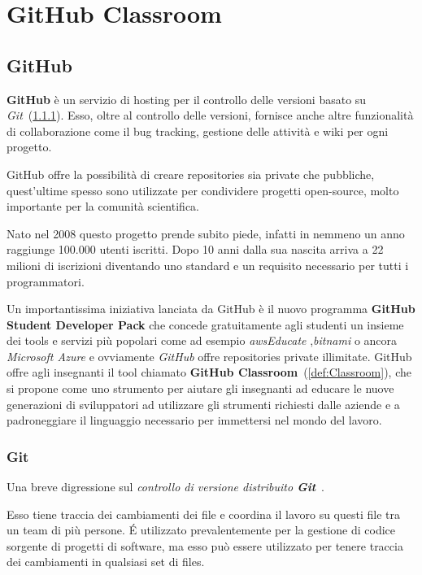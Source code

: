 
\chapter{GitHub Classroom}
	\section{GitHub}
		\textbf{GitHub} è un servizio di hosting per il controllo delle versioni basato su \textit{Git}~(\ref{def:Git}).
		Esso, oltre al controllo delle versioni, fornisce anche altre funzionalità di collaborazione come il bug tracking, gestione delle attività e wiki per ogni progetto.
		
		GitHub offre la possibilità di creare repositories sia private che pubbliche, quest'ultime spesso sono utilizzate per condividere progetti open-source, molto importante per la comunità scientifica.
		
		Nato nel 2008 questo progetto prende subito piede, infatti in nemmeno un anno raggiunge 100.000 utenti iscritti. Dopo 10 anni dalla sua nascita arriva a 22 milioni di iscrizioni diventando uno standard  e un requisito necessario per tutti i programmatori.
		
		Un importantissima iniziativa lanciata da GitHub è il nuovo programma \textbf{GitHub Student Developer Pack} che concede gratuitamente agli studenti un insieme dei tools e servizi più popolari come ad esempio \textit{awsEducate} ,\textit{bitnami} o ancora \textit{Microsoft Azure} e ovviamente \textit{GitHub} offre repositories private illimitate.
		GitHub offre agli insegnanti il tool chiamato \textbf{GitHub Classroom}~(\ref{def:Classroom}), che si propone come uno strumento per aiutare gli insegnanti ad  educare le nuove generazioni di sviluppatori ad utilizzare gli strumenti richiesti dalle aziende e a padroneggiare il linguaggio necessario per immettersi nel mondo del lavoro.
	
		\subsection{Git}\label{def:Git}
			Una breve digressione sul \textit{controllo di versione distribuito \textbf{Git}}~\citep{ProGit2018}.
			
			Esso tiene traccia dei cambiamenti dei file e coordina il lavoro su questi file tra un team di più persone.
			\'E utilizzato prevalentemente per la gestione di codice sorgente di progetti di software, ma esso può essere utilizzato per tenere traccia dei cambiamenti in  qualsiasi set di files.
			
